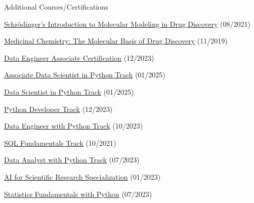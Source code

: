 \begin{cventries}
  \cventry
    {}
    {Additional Courses/Certifications}
    {}
    {}
    {
        \begin{cvitems}
            \item{\href{https://api.badgr.io/public/assertions/zZ7-bHnkTcm6H_UNr2s-LA}{Schrödinger's Introduction to Molecular Modeling in Drug Discovery} (08/2021)}           
            \item{\href{https://courses.edx.org/certificates/27307d91954041dab94af0ff554bc378}{Medicinal Chemistry: The Molecular Basis of Drug Discovery} (11/2019)}
            \item{\href{https://www.datacamp.com/certificate/DEA0011913814162}{Data Engineer Associate Certification} (12/2023)}
            \item{\href{https://www.datacamp.com/completed/statement-of-accomplishment/track/001ce60122d90d6117abb37e6b959eff79810b59}{Associate Data Scientist in Python Track} (01/2025)}
            \item{\href{https://www.datacamp.com/completed/statement-of-accomplishment/track/f94f0703ec170e3314fb2054504a159a3dd7c7ee}{Data Scientist in Python Track} (01/2025)}
            \item{\href{https://www.datacamp.com/statement-of-accomplishment/track/d27013d491083bee7eb7302d45d142e6eff5c4c9}{Python Developer Track} (12/2023)}
            \item{\href{https://www.datacamp.com/completed/statement-of-accomplishment/track/fb10963085f36d129d1ac686f14acd5bb255d33d}{Data Engineer with Python Track} (10/2023)}
            \item{\href{https://www.datacamp.com/statement-of-accomplishment/track/941904e6394e2951693441d466f4643e5edfb4de}{SQL Fundamentals Track} (10/2021)}
            \item{\href{https://www.datacamp.com/completed/statement-of-accomplishment/track/4d9fb22f2514baecb5866aecd4421ba951e418a1}{Data Analyst with Python Track} (07/2023)}
            \item{\href{https://www.coursera.org/account/accomplishments/specialization/XU23J53N3SAW}{AI for Scientific Research Specialization} (01/2023)}
            \item{\href{https://www.datacamp.com/completed/statement-of-accomplishment/track/f6b840f135825806cde25b622730d804b8e9b987}{Statistics Fundamentals with Python} (07/2023)}

\end{cvitems}}
\end{cventries}

